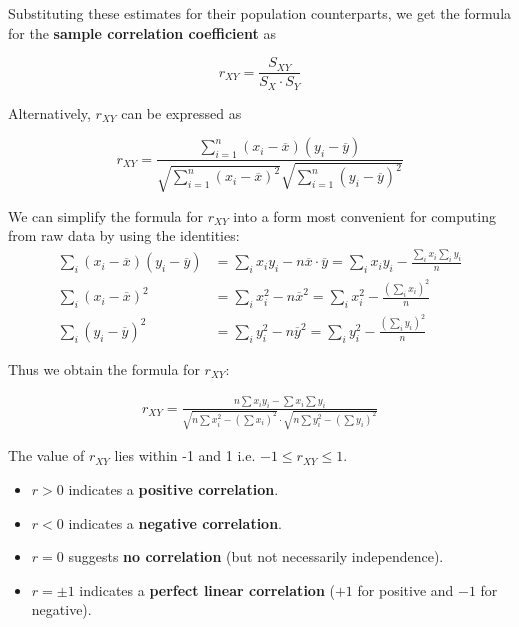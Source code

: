 \documentclass[twoside]{book}
\begin{document}
Substituting these estimates for their population counterparts, we get the formula for the \textbf{sample correlation coefficient} as

\begin{textbox}
	\[
	r_{XY} = \dfrac{S_{XY}}{S_X \cdot S_Y}
	\]
\end{textbox}
Alternatively, $r_{XY}$ can be expressed as
\begin{textbox}
\[
r_{XY} = \dfrac{\sum_{i=1}^{n} (x_i - \overline{x})(y_i - \overline{y})}{\sqrt{\sum_{i=1}^{n} (x_i - \overline{x})^2} \sqrt{\sum_{i=1}^{n} (y_i - \overline{y})^2}}
\]
\end{textbox}

We can simplify the formula for $r_{XY}$ into a form most convenient for computing from raw data by using the identities:
\begin{align*}
\sum_i (x_i - \overline{x})(y_i - \overline{y}) &= \sum_i x_i y_i - n\overline{x}\cdot \overline{y} = \sum_i x_i y_i - \frac{\sum_i x_i \sum_i y_i}{n} \\
\sum_i (x_i - \overline{x})^2 &= \sum_i x_i^2 -n\overline{x}^2= \sum_i x_i^2 - \frac{(\sum_i x_i)^2}{n} \\
\sum_i (y_i - \overline{y})^2 &= \sum_i y_i^2 -n\overline{y}^2= \sum_i y_i^2 - \frac{(\sum_i y_i)^2}{n}
\end{align*}

Thus we obtain the formula for $r_{XY}$:
\begin{textbox}
\begin{align*}
r_{XY} = \frac{n \sum x_i y_i - \sum x_i \sum y_i}
{\sqrt{n \sum x_i^2 - (\sum x_i)^2} \cdot \sqrt{n \sum y_i^2 - (\sum y_i)^2}}
\end{align*}
\end{textbox}

The value of $r_{XY}$ lies within -1 and 1 i.e. $-1 \leq r_{XY} \leq 1$.
\begin{textbox}
\begin{itemize}
	\item $r > 0$ indicates a \textbf{positive correlation}.
	\item $r < 0$ indicates a \textbf{negative correlation}.
	\item $r = 0$ suggests \textbf{no correlation} (but not necessarily independence).
	\item $r = \pm 1$ indicates a \textbf{perfect linear correlation} ($+1$ for positive and $-1$ for negative).
\end{itemize}
\end{textbox}
\end{document}
